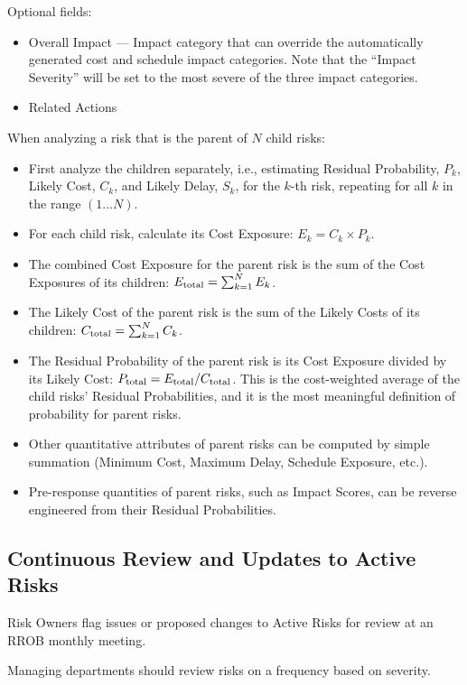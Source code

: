 Optional fields:
\begin{itemize}
	\item Overall Impact --- Impact category that can override the automatically generated cost and schedule impact categories.
	Note that the ``Impact Severity'' will be set to the most severe of the three impact categories.
	\item Related Actions
\end{itemize}

When analyzing a risk that is the parent of $N$ child risks:

\begin{itemize}
	\item First analyze the children separately, i.e., estimating Residual Probability, $P_k$, Likely Cost, $C_k$, and Likely Delay, $S_k$, for the $k$-th risk, repeating for all $k$ in the range $(1 \ldots N)$.
	\item For each child risk, calculate its Cost Exposure: $E_k = C_k \times P_k$.
	\item The combined Cost Exposure for the parent risk is the sum of the Cost Exposures of its children: $E_{\rm total} = \sum_{k=1}^N E_k$.
	\item The Likely Cost of the parent risk is the sum of the Likely Costs of its children: $C_{\rm total} = \sum_{k=1}^N C_k$.
	\item The Residual Probability of the parent risk is its Cost Exposure divided by its Likely Cost: $P_{\rm total} = E_{\rm total} / C_{\rm total}$.
	This is the cost-weighted average of the child risks' Residual Probabilities, and it is the most meaningful definition of probability for parent risks.
	\item Other quantitative attributes of parent risks can be computed by simple summation (Minimum Cost, Maximum Delay, Schedule Exposure, etc.).
	\item Pre-response quantities of parent risks, such as Impact Scores, can be reverse engineered from their Residual Probabilities.
\end{itemize}

\subsection{Continuous Review and Updates to Active Risks}

Risk Owners flag issues or proposed changes to Active Risks for review at an RROB monthly meeting.

Managing departments should review risks on a frequency based on severity.

